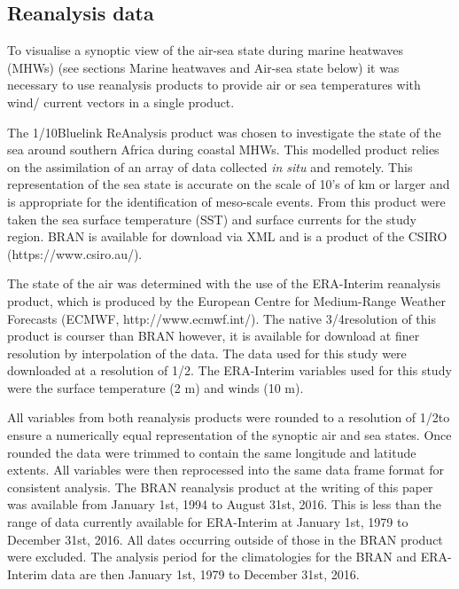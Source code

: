 \documentclass[a4paper,10pt,review]{elsarticle}
\begin{document}
\subsection{Reanalysis data}
To visualise a synoptic view of the air-sea state during marine heatwaves (MHWs) (see sections Marine heatwaves and Air-sea state below) it was necessary to use reanalysis products to provide air or sea temperatures with wind/ current vectors in a single product.

The 1/10\degree Bluelink ReAnalysis product was chosen to investigate the state of the sea around southern Africa during coastal MHWs. This modelled product relies on the assimilation of an array of data collected \emph{in situ} and remotely. This representation of the sea state is accurate on the scale of 10's of km or larger and is appropriate for the identification of meso-scale events. From this product were taken the sea surface temperature (SST) and surface currents for the study region. BRAN is available for download via XML and is a product of the CSIRO (https://www.csiro.au/).

The state of the air was determined with the use of the ERA-Interim reanalysis product, which is produced by the European Centre for Medium-Range Weather Forecasts (ECMWF, http://www.ecmwf.int/). The native 3/4\degree resolution of this product is courser than BRAN however, it is available for download at finer resolution by interpolation of the data. The data used for this study were downloaded at a resolution of 1/2\degree. The ERA-Interim variables used for this study were the surface temperature (2 m) and winds (10 m). 

All variables from both reanalysis products were rounded to a resolution of 1/2\degree to ensure a numerically equal representation of the synoptic air and sea states. Once rounded the data were trimmed to contain the same longitude and latitude extents. All variables were then reprocessed into the same data frame format for consistent analysis. The BRAN reanalysis product at the writing of this paper was available from January 1st, 1994 to August 31st, 2016. This is less than the range of data currently available for ERA-Interim at January 1st, 1979 to December 31st, 2016. All dates occurring outside of those in the BRAN product were excluded. The analysis period for the climatologies for the BRAN and ERA-Interim data are then January 1st, 1979 to December 31st, 2016.
\end{document}
